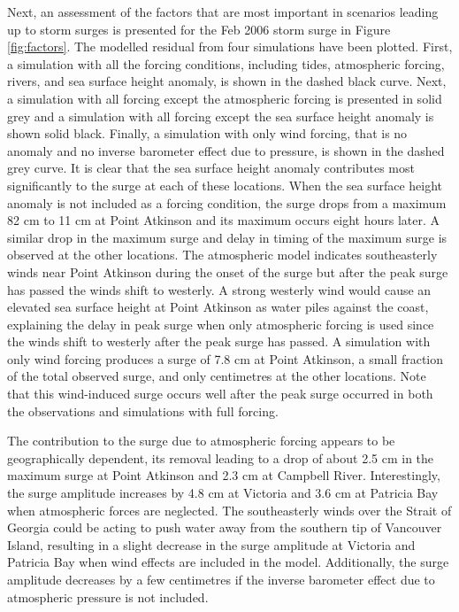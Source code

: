 \documentclass[pdftex,10pt]{article}
\begin{document}
Next, an assessment of the factors that are most important in scenarios leading up to storm surges is presented for the Feb 2006 storm surge in Figure \ref{fig:factors}. The modelled residual from four simulations have been plotted. First, a simulation with all the forcing conditions, including tides, atmospheric forcing, rivers, and sea surface height anomaly, is shown in the dashed black curve. Next, a simulation with all forcing except the atmospheric forcing is presented in solid grey and a simulation with all forcing except the sea surface height anomaly is shown solid black. Finally, a simulation with only wind forcing, that is no anomaly and no inverse barometer effect due to pressure, is shown in the dashed grey curve. It is clear that the sea surface height anomaly contributes most significantly to the surge at each of these locations. When the sea surface height anomaly is not included as a forcing condition, the surge drops from a maximum 82 cm to 11 cm at Point Atkinson and its maximum occurs eight hours later.  A similar drop in the maximum surge and delay in timing of the maximum surge is observed at the other locations. The atmospheric model indicates southeasterly winds near Point Atkinson during the onset of the surge but after the peak surge has passed the winds shift to westerly. A strong westerly wind would cause an elevated sea surface height at Point Atkinson as water piles against the coast, explaining the delay in peak surge when only atmospheric forcing is used since the winds shift to westerly after the peak surge has passed. A simulation with only wind forcing produces a surge of 7.8 cm at Point Atkinson, a small fraction of the total observed surge, and only centimetres at the other locations. Note that this wind-induced surge occurs well after the peak surge occurred in both the observations and simulations with full forcing.

The contribution to the surge due to atmospheric forcing appears to be geographically dependent, its removal leading to a drop of about 2.5 cm in the maximum surge at Point Atkinson and 2.3 cm at Campbell River. Interestingly, the surge amplitude increases by 4.8 cm at Victoria and 3.6 cm at Patricia Bay when atmospheric forces are neglected. The southeasterly winds over the Strait of Georgia could be acting to push water away from the southern tip of Vancouver Island, resulting in a slight decrease in the surge amplitude at Victoria and Patricia Bay when wind effects are included in the model. Additionally, the surge amplitude decreases by a few centimetres if the inverse barometer effect due to atmospheric pressure is not included. 
\end{document}
